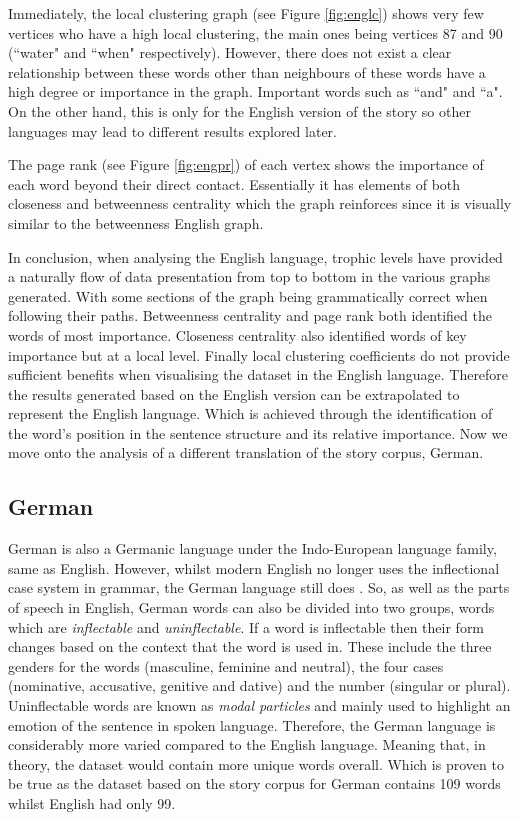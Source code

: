 Immediately, the local clustering graph (see Figure \ref{fig:englc}) shows very few vertices who have a high local clustering, the main ones being vertices 87 and 90 (``water" and ``when" respectively). However, there does not exist a clear relationship between these words other than neighbours of these words have a high degree or importance in the graph. Important words such as ``and" and ``a". On the other hand, this is only for the English version of the story so other languages may lead to different results explored later. 

The page rank (see Figure \ref{fig:engpr}) of each vertex shows the importance of each word beyond their direct contact. Essentially it has elements of both closeness and betweenness centrality which the graph reinforces since it is visually similar to the betweenness English graph.

In conclusion, when analysing the English language, trophic levels have provided a naturally flow of data presentation from top to bottom in the various graphs generated. With some sections of the graph being grammatically correct when following their paths. Betweenness centrality and page rank both identified the words of most importance. Closeness centrality also identified words of key importance but at a local level. Finally local clustering coefficients do not provide sufficient benefits when visualising the dataset in the English language. Therefore the results generated based on the English version can be extrapolated to represent the English language. Which is achieved through the identification of the word's position in the sentence structure and its relative importance. Now we move onto the analysis of a different translation of the story corpus, German.

\subsection{German}
German is also a Germanic language under the Indo-European language family, same as English. However, whilst modern English no longer uses the inflectional case system in grammar, the German language still does \cite{durrell2011hammer}. So, as well as the parts of speech in English, German words can also be divided into two groups, words which are \emph{inflectable} and \emph{uninflectable}. If a word is inflectable then their form changes based on the context that the word is used in. These include the three genders for the words (masculine, feminine and neutral), the four cases (nominative, accusative, genitive and dative) and the number (singular or plural). Uninflectable words are known as \emph{modal particles} and mainly used to highlight an emotion of the sentence in spoken language. Therefore, the German language is considerably more varied compared to the English language. Meaning that, in theory, the dataset would contain more unique words overall. Which is proven to be true as the dataset based on the story corpus for German contains 109 words whilst English had only 99.

